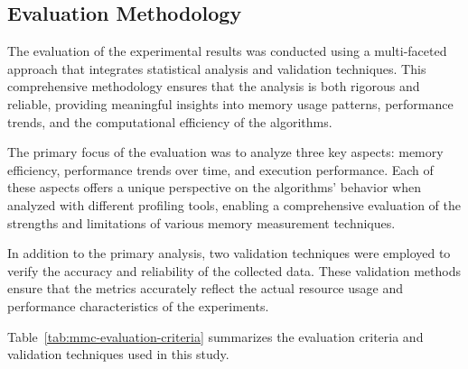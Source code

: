 \subsection{Evaluation Methodology}
\label{subsec:mmc-evaluation-methodology}

The evaluation of the experimental results was conducted using a multi-faceted approach that integrates statistical analysis and validation techniques.
This comprehensive methodology ensures that the analysis is both rigorous and reliable, providing meaningful insights into memory usage patterns, performance trends, and the computational efficiency of the algorithms.

The primary focus of the evaluation was to analyze three key aspects: memory efficiency, performance trends over time, and execution performance.
Each of these aspects offers a unique perspective on the algorithms’ behavior when analyzed with different profiling tools, enabling a comprehensive evaluation of the strengths and limitations of various memory measurement techniques.

In addition to the primary analysis, two validation techniques were employed to verify the accuracy and reliability of the collected data.
These validation methods ensure that the metrics accurately reflect the actual resource usage and performance characteristics of the experiments.

Table~\ref{tab:mmc-evaluation-criteria} summarizes the evaluation criteria and validation techniques used in this study.

